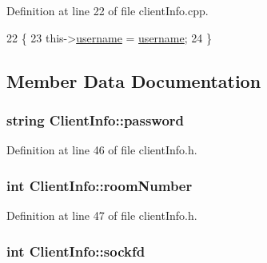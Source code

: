 Definition at line 22 of file client\+Info.\+cpp.


\begin{DoxyCode}
22                                            \{
23     this->\hyperlink{class_client_info_abb5d48a0c38e02d8ae706be2cfd63877}{username} = \hyperlink{class_client_info_abb5d48a0c38e02d8ae706be2cfd63877}{username};
24 \}
\end{DoxyCode}


\subsection{Member Data Documentation}
\subsubsection[{\texorpdfstring{password}{password}}]{\setlength{\rightskip}{0pt plus 5cm}string Client\+Info\+::password\hspace{0.3cm}{\ttfamily [private]}}\hypertarget{class_client_info_aef295b0c02aed068c75eef7d24b0739d}{}\label{class_client_info_aef295b0c02aed068c75eef7d24b0739d}


Definition at line 46 of file client\+Info.\+h.

\subsubsection[{\texorpdfstring{room\+Number}{roomNumber}}]{\setlength{\rightskip}{0pt plus 5cm}int Client\+Info\+::room\+Number\hspace{0.3cm}{\ttfamily [private]}}\hypertarget{class_client_info_a7058c5f8b9c7295eb02e79f64ceb8919}{}\label{class_client_info_a7058c5f8b9c7295eb02e79f64ceb8919}


Definition at line 47 of file client\+Info.\+h.

\subsubsection[{\texorpdfstring{sockfd}{sockfd}}]{\setlength{\rightskip}{0pt plus 5cm}int Client\+Info\+::sockfd\hspace{0.3cm}{\ttfamily [private]}}\hypertarget{class_client_info_a45f3edd658463cb224352e237104790e}{}\label{class_client_info_a45f3edd658463cb224352e237104790e}


